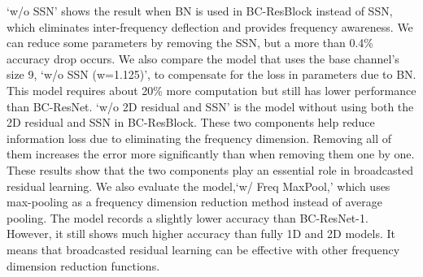\documentclass[a4paper]{article}
\begin{document}
`w/o SSN' shows the result when BN is used in BC-ResBlock instead of SSN, which eliminates inter-frequency deflection and provides frequency awareness. We can reduce some parameters by removing the SSN, but a more than 0.4\% accuracy drop occurs. We also compare the model that uses the base channel's size 9, `w/o SSN (w=1.125)', to compensate for the loss in parameters due to BN. This model requires about 20\% more computation but still has lower performance than BC-ResNet. \nocite{chang2018broadcasting} 
`w/o 2D residual and SSN' is the model without using both the 2D residual and SSN in BC-ResBlock. These two components help reduce information loss due to eliminating the frequency dimension. Removing all of them increases the error more significantly than when removing them one by one. These results show that the two components play an essential role in broadcasted residual learning.
We also evaluate the model,`w/ Freq MaxPool,' which uses max-pooling as a frequency dimension reduction method instead of average pooling. The model records a slightly lower accuracy than BC-ResNet-1. However, it still shows much higher accuracy than fully 1D and 2D models. It means that broadcasted residual learning can be effective with other frequency dimension reduction functions.
\end{document}
